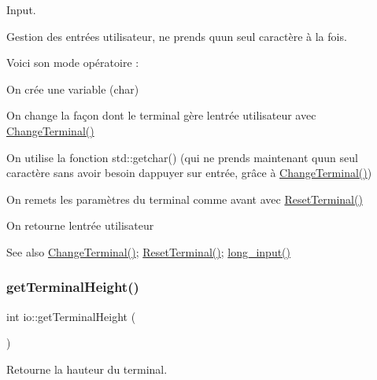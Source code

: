 Input. 

Gestion des entrées utilisateur, ne prends qu\textquotesingle{}un seul caractère à la fois.

Voici son mode opératoire \+:
\begin{DoxyEnumerate}
\item On crée une variable (char)
\item On change la façon dont le terminal gère l\textquotesingle{}entrée utilisateur avec \hyperlink{namespaceio_ac0223d0ecfee82d8cc86543604173b73}{Change\+Terminal()}
\item On utilise la fonction std\+::getchar() (qui ne prends maintenant qu\textquotesingle{}un seul caractère sans avoir besoin d\textquotesingle{}appuyer sur entrée, grâce à \hyperlink{namespaceio_ac0223d0ecfee82d8cc86543604173b73}{Change\+Terminal()})
\item On remets les paramètres du terminal comme avant avec \hyperlink{namespaceio_a44a79937063c75bdcd8f042d5f55d501}{Reset\+Terminal()}
\item On retourne l\textquotesingle{}entrée utilisateur \begin{DoxySeeAlso}{See also}
\hyperlink{namespaceio_ac0223d0ecfee82d8cc86543604173b73}{Change\+Terminal()}; \hyperlink{namespaceio_a44a79937063c75bdcd8f042d5f55d501}{Reset\+Terminal()}; \hyperlink{namespaceio_ab044be3afd7ac04eeb1a496af0f1d5c6}{long\+\_\+input()} 
\end{DoxySeeAlso}

\end{DoxyEnumerate}\mbox{\label{namespaceio_ab7da8a98a7b636d1d5f0f6eb820f1f81}} 
\subsubsection{\texorpdfstring{get\+Terminal\+Height()}{getTerminalHeight()}}
{\footnotesize\ttfamily int io\+::get\+Terminal\+Height (\begin{DoxyParamCaption}{ }\end{DoxyParamCaption})}



Retourne la hauteur du terminal. 

\mbox{\label{namespaceio_a71636a15a219ee1dcc177e9749cf20bc}} 
